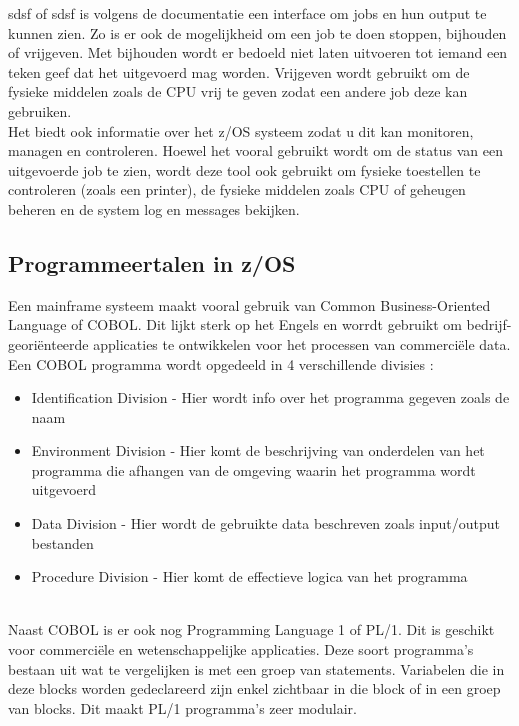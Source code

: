 \acrlong{sdsf} of \acrshort{sdsf} is volgens de \textcite{IBM2023} documentatie een interface om jobs en hun output te kunnen zien. Zo is er ook de mogelijkheid om een job te doen stoppen, bijhouden of vrijgeven. Met bijhouden wordt er bedoeld niet laten uitvoeren tot iemand een teken geef dat het uitgevoerd mag worden. Vrijgeven wordt gebruikt om de fysieke middelen zoals de CPU vrij te geven zodat een andere job deze kan gebruiken. \\ 
Het biedt ook informatie over het \gls{z/OS} systeem zodat u dit kan monitoren, managen en controleren. Hoewel het vooral gebruikt wordt om de status van een uitgevoerde job te zien, wordt deze tool ook gebruikt om fysieke toestellen te controleren (zoals een printer), de fysieke middelen zoals CPU of geheugen beheren en de system log en messages bekijken.

\subsection{Programmeertalen in z/OS}
Een mainframe systeem maakt vooral gebruik van Common Business-Oriented Language of COBOL. Dit lijkt sterk op het Engels en worrdt gebruikt om bedrijf-georiënteerde applicaties te ontwikkelen voor het processen van commerciële data. Een COBOL programma wordt opgedeeld in 4 verschillende divisies \autocite{IBMc}:
\begin{itemize}
    \item Identification Division - Hier wordt info over het programma gegeven zoals de naam
    \item Environment Division - Hier komt de beschrijving van onderdelen van het programma die afhangen van de omgeving waarin het programma wordt uitgevoerd
    \item Data Division - Hier wordt de gebruikte data beschreven zoals input/output bestanden
    \item Procedure Division - Hier komt de effectieve logica van het programma
\end{itemize} \\

Naast COBOL is er ook nog Programming Language 1 of PL/1. Dit is geschikt voor commerciële en wetenschappelijke applicaties. Deze soort programma's bestaan uit  wat te vergelijken is met een groep van statements. Variabelen die in deze blocks worden gedeclareerd zijn enkel zichtbaar in die block of in een groep van blocks. Dit maakt PL/1 programma's zeer modulair. \autocite{IBMc}

